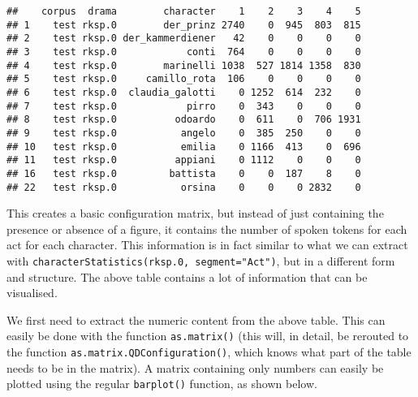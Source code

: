 \documentclass[]{book}
\newenvironment{Shaded}{\begin{snugshade}}{\end{snugshade}}
\newcommand{\CommentTok}[1]{\textcolor[rgb]{0.56,0.35,0.01}{\textit{#1}}}
\newcommand{\DataTypeTok}[1]{\textcolor[rgb]{0.13,0.29,0.53}{#1}}
\newcommand{\DecValTok}[1]{\textcolor[rgb]{0.00,0.00,0.81}{#1}}
\newcommand{\FloatTok}[1]{\textcolor[rgb]{0.00,0.00,0.81}{#1}}
\newcommand{\KeywordTok}[1]{\textcolor[rgb]{0.13,0.29,0.53}{\textbf{#1}}}
\newcommand{\NormalTok}[1]{#1}
\newcommand{\OperatorTok}[1]{\textcolor[rgb]{0.81,0.36,0.00}{\textbf{#1}}}
\newcommand{\StringTok}[1]{\textcolor[rgb]{0.31,0.60,0.02}{#1}}
\begin{document}
\begin{verbatim}
##    corpus  drama        character    1    2    3    4    5
## 1    test rksp.0        der_prinz 2740    0  945  803  815
## 2    test rksp.0 der_kammerdiener   42    0    0    0    0
## 3    test rksp.0            conti  764    0    0    0    0
## 4    test rksp.0        marinelli 1038  527 1814 1358  830
## 5    test rksp.0     camillo_rota  106    0    0    0    0
## 6    test rksp.0  claudia_galotti    0 1252  614  232    0
## 7    test rksp.0            pirro    0  343    0    0    0
## 8    test rksp.0          odoardo    0  611    0  706 1931
## 9    test rksp.0           angelo    0  385  250    0    0
## 10   test rksp.0           emilia    0 1166  413    0  696
## 11   test rksp.0          appiani    0 1112    0    0    0
## 16   test rksp.0         battista    0    0  187    8    0
## 22   test rksp.0           orsina    0    0    0 2832    0
\end{verbatim}

This creates a basic configuration matrix, but instead of just containing the presence or absence of a figure, it contains the number of spoken tokens for each act for each character. This information is in fact similar to what we can extract with \texttt{characterStatistics(rksp.0,\ segment="Act")}, but in a different form and structure. The above table contains a lot of information that can be visualised.

We first need to extract the numeric content from the above table. This can easily be done with the function \texttt{as.matrix()} (this will, in detail, be rerouted to the function \texttt{as.matrix.QDConfiguration()}, which knows what part of the table needs to be in the matrix). A matrix containing only numbers can easily be plotted using the regular \texttt{barplot()} function, as shown below.

\begin{Shaded}
\end{Shaded}
\end{document}
